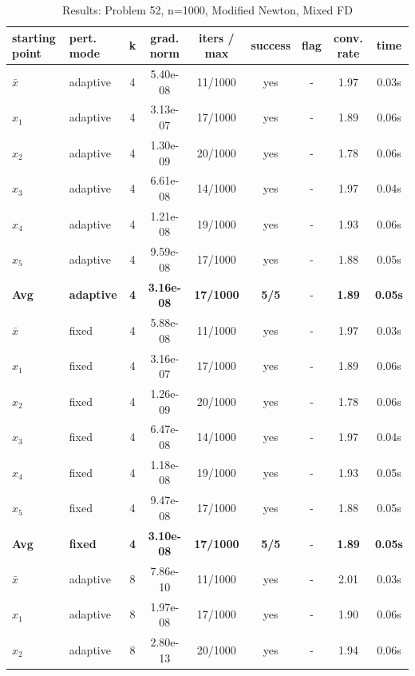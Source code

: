 \begin{longtable}{|l|l|c|c|c|c|c|c|c|}
\caption{Results: Problem 52, n=1000, Modified Newton, Mixed FD} \\
\hline
\textbf{starting point} & \textbf{pert. mode} & \textbf{k} & \textbf{grad. norm} & \textbf{iters / max} & \textbf{success} & \textbf{flag} & \textbf{conv. rate} & \textbf{time} \\
\hline
\endfirsthead
\endhead
\endfoot
\hline
\endlastfoot
$\bar{x}$ & adaptive & 4 & 5.40e-08 & 11/1000 & yes & - & 1.97 & 0.03s \\
\hline
$x_1$ & adaptive & 4 & 3.13e-07 & 17/1000 & yes & - & 1.89 & 0.06s \\
\hline
$x_2$ & adaptive & 4 & 1.30e-09 & 20/1000 & yes & - & 1.78 & 0.06s \\
\hline
$x_3$ & adaptive & 4 & 6.61e-08 & 14/1000 & yes & - & 1.97 & 0.04s \\
\hline
$x_4$ & adaptive & 4 & 1.21e-08 & 19/1000 & yes & - & 1.93 & 0.06s \\
\hline
$x_5$ & adaptive & 4 & 9.59e-08 & 17/1000 & yes & - & 1.88 & 0.05s \\
\hline
\hline\hline
\textbf{Avg} & \textbf{adaptive} & \textbf{4} & \textbf{3.16e-08} & \textbf{17/1000} & \textbf{5/5} & - & \textbf{1.89} & \textbf{0.05s} \\
\hline\hline
\hline
$\bar{x}$ & fixed & 4 & 5.88e-08 & 11/1000 & yes & - & 1.97 & 0.03s \\
\hline
$x_1$ & fixed & 4 & 3.16e-07 & 17/1000 & yes & - & 1.89 & 0.06s \\
\hline
$x_2$ & fixed & 4 & 1.26e-09 & 20/1000 & yes & - & 1.78 & 0.06s \\
\hline
$x_3$ & fixed & 4 & 6.47e-08 & 14/1000 & yes & - & 1.97 & 0.04s \\
\hline
$x_4$ & fixed & 4 & 1.18e-08 & 19/1000 & yes & - & 1.93 & 0.05s \\
\hline
$x_5$ & fixed & 4 & 9.47e-08 & 17/1000 & yes & - & 1.88 & 0.05s \\
\hline
\hline\hline
\textbf{Avg} & \textbf{fixed} & \textbf{4} & \textbf{3.10e-08} & \textbf{17/1000} & \textbf{5/5} & - & \textbf{1.89} & \textbf{0.05s} \\
\hline\hline
$\bar{x}$ & adaptive & 8 & 7.86e-10 & 11/1000 & yes & - & 2.01 & 0.03s \\
\hline
$x_1$ & adaptive & 8 & 1.97e-08 & 17/1000 & yes & - & 1.90 & 0.06s \\
\hline
$x_2$ & adaptive & 8 & 2.80e-13 & 20/1000 & yes & - & 1.94 & 0.06s \\

\end{longtable}
